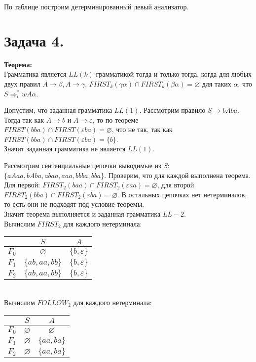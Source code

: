 \documentclass[12pt]{article}
\theoremstyle{definition}
\theoremstyle{definition}
\let\ra\rightarrow
\let\epsilon\varepsilon
\let\eps\varepsilon
\begin{document}
\noindent По таблице построим детерминированный левый анализатор.\\


\section*{Задача 4.}
\noindent \textbf{Теорема:} \\
Грамматика является $LL(k)$-грамматикой тогда и только тогда, когда для любых двух правил $A \ra \beta, A \ra \gamma$, $FIRST_k(\gamma\alpha)\cap FIRST_k(\beta\alpha) = \varnothing $ для таких $\alpha$, что $ S \Rightarrow^{*}_l wA\alpha$.

Допустим, что заданная грамматика $LL(1)$. Рассмотрим правило $S \ra bAba.$ Тогда так как $A \ra b$ и $A \ra \epsilon$, то по теореме\\ $FIRST(bba) \cap FIRST(\epsilon ba) = \varnothing$, что не так, так как\\ $FIRST(bba) \cap FIRST(\epsilon ba) = \{b\}$.\\
Значит заданная грамматика не является $LL(1)$.

Рассмотрим сентенциальные цепочки выводимые из $S$:\\ $\{aAaa, bAba, abaa, aaa, bbba, bba\}$. Проверим, что для каждой выполнена теорема. Для первой: $FIRST_2(baa) \cap FIRST_2(\epsilon aa) = \varnothing$, для второй $FIRST_2(bba) \cap FIRST_2(\epsilon ba) = \varnothing$. В остальных цепочках нет нетерминалов, то есть они не подходят под условие теоремы.\\
Значит теорема выполняется и заданная грамматика $LL-2$.\\


Вычислим $FIRST_2$ для каждого нетерминала:\\
\begin{tabular}{|c||c|c|}
\hline
&$S$ &$A$\\
\hline
$F_0$ & $\varnothing$  & $\{b, \eps\}$\\
$F_1$ & $\{ab, aa, bb\}$  & $\{b, \eps\}$\\
$F_2$ & $\{ab, aa, bb\}$  & $\{b, \eps\}$\\
\hline
\end{tabular}\\

Вычислим $FOLLOW_2$ для каждого нетерминала:\\
\begin{tabular}{|c||c|c|}
\hline
&$S$ &$A$\\
\hline
$F_0$ & $\varnothing$  & $\varnothing$\\
$F_1$ & $\varnothing$  & $\{aa, ba\}$\\
$F_2$ & $\varnothing$  & $\{aa, ba\}$\\

\hline
\end{tabular}\\
\end{document}
